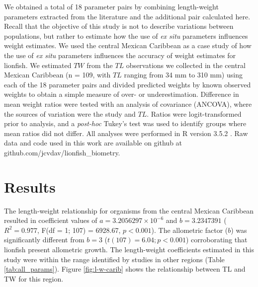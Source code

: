 \documentclass[fleqn,10pt,lineno]{wlpeerj} %
\begin{document}
We obtained a total of 18 parameter pairs by combining length-weight
parameters extracted from the literature and the additional pair
calculated here. Recall that the objective of this study is not to
describe variations between populations, but rather to estimate how the
use of \emph{ex situ} parameters influences weight estimates. We used
the central Mexican Caribbean as a case study of how the use of \emph{ex
situ} parameters influences the accuracy of weight estimates for
lionfish. We estimated \(TW\) from the \(TL\) observations we collected
in the central Mexican Caribbean (n = 109, with \(TL\) ranging from 34
mm to 310 mm) using each of the 18 parameter pairs and divided predicted
weights by known observed weights to obtain a simple measure of over- or
underestimation. Difference in mean weight ratios were tested with an
analysis of covariance (ANCOVA), where the sources of variation were the
study and \(TL\). Ratios were logit-transformed prior to analysis, and a
\emph{post-hoc} Tukey's test was used to identify groups where mean
ratios did not differ. All analyses were performed in R version 3.5.2
\citep{rcore_2018}. Raw data and code used in this work are available on
github at github.com/jcvdav/lionfish\_biometry.

\section*{Results}

The length-weight relationship for organisms from the central Mexican
Caribbean resulted in coefficient values of
\(a = 3.2056297\times 10^{-6}\) and \(b = 3.2347391\) (\(R^2 = 0.977\),
F(df = 1; 107) = 6928.67, \(p < 0.001\)). The allometric factor (\(b\))
was significantly different from \(b = 3\) (\(t(107) = 6.04; p<0.001\))
corroborating that lionfish present allometric growth. The length-weight
coefficients estimated in this study were within the range identified by
studies in other regions (Table \ref{tab:all_params}). Figure
\ref{fig:l-w-carib} shows the relationship between TL and TW for this
region.
\end{document}

